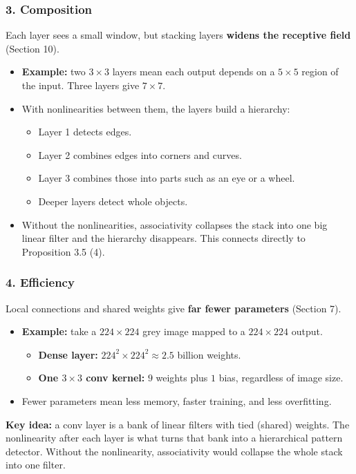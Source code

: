 \subsubsection*{3. Composition}
Each layer sees a small window, but stacking layers \textbf{widens the receptive field} (Section 10).
\begin{itemize}
  \item \textbf{Example:} two $3 \times 3$ layers mean each output depends on a $5 \times 5$ region of the input. Three layers give $7 \times 7$.
  \item With nonlinearities between them, the layers build a hierarchy:
  \begin{itemize}
    \item Layer 1 detects edges.
    \item Layer 2 combines edges into corners and curves.
    \item Layer 3 combines those into parts such as an eye or a wheel.
    \item Deeper layers detect whole objects.
  \end{itemize}
  \item Without the nonlinearities, associativity collapses the stack into one big linear filter and the hierarchy disappears. This connects directly to Proposition 3.5 (4).
\end{itemize}

\subsubsection*{4. Efficiency}
Local connections and shared weights give \textbf{far fewer parameters} (Section 7).
\begin{itemize}
  \item \textbf{Example:} take a $224 \times 224$ grey image mapped to a $224 \times 224$ output.
  \begin{itemize}
    \item \textbf{Dense layer:} $224^2 \times 224^2 \approx 2.5$ billion weights.
    \item \textbf{One $3 \times 3$ conv kernel:} $9$ weights plus $1$ bias, regardless of image size.
  \end{itemize}
  \item Fewer parameters mean less memory, faster training, and less overfitting.
\end{itemize}

\textbf{Key idea:} a conv layer is a bank of linear filters with tied (shared) weights. The nonlinearity after each layer is what turns that bank into a hierarchical pattern detector. Without the nonlinearity, associativity would collapse the whole stack into one filter.


